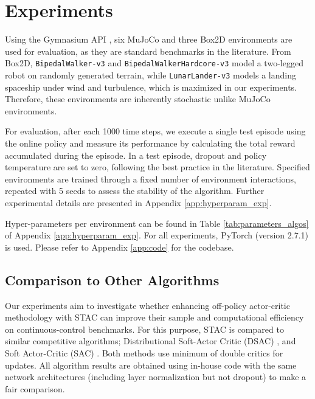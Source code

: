 \documentclass[10pt]{article} %
\begin{document}
\section{Experiments}
\label{sec:experiments}

Using the Gymnasium API \citep{towers_gymnasium_2023}, six MuJoCo and three Box2D environments are used for evaluation, as they are standard benchmarks in the literature. From Box2D, \verb|BipedalWalker-v3| and \verb|BipedalWalkerHardcore-v3| model a two-legged robot on randomly generated terrain, while \verb|LunarLander-v3| models a landing spaceship under wind and turbulence, which is maximized in our experiments. Therefore, these environments are inherently stochastic unlike MuJoCo environments. 


For evaluation, after each 1000 time steps, we execute a single test episode using the online policy and measure its performance by calculating the total reward accumulated during the episode. In a test episode, dropout and policy temperature are set to zero, following the best practice in the literature. Specified environments are trained through a fixed number of environment interactions, repeated with 5 seeds to assess the stability of the algorithm. Further experimental details are presented in Appendix \ref{app:hyperparam_exp}.

Hyper-parameters per environment can be found in Table \ref{tab:parameters_algos} of Appendix \ref{app:hyperparam_exp}. For all experiments, PyTorch (version 2.7.1) \citep{paszke2019pytorch} is used. Please refer to Appendix \ref{app:code} for the codebase. 

\subsection{Comparison to Other Algorithms}

Our experiments aim to investigate whether enhancing off-policy actor-critic methodology with STAC can improve their sample and computational efficiency on continuous-control benchmarks. For this purpose, STAC is compared to similar competitive algorithms; Distributional Soft-Actor Critic (DSAC) \citep{ma2025dsac}, and Soft Actor-Critic (SAC) \citep{haarnoja2018soft}. Both methods use minimum of double critics for updates. All algorithm results are obtained using in-house code with the same network architectures (including layer normalization but not dropout) to make a fair comparison. 
\end{document}
